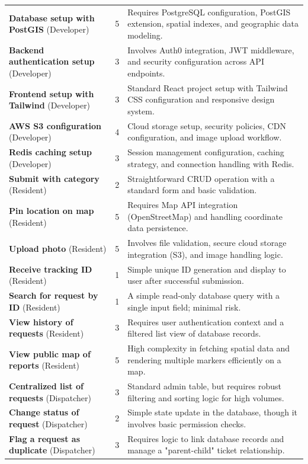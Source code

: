 \documentclass[12pt,a4paper]{article}
\begin{document}
\begin{longtable}{|p{}|c|p{}|}
\textbf{Database setup with PostGIS} (Developer) & 5 & Requires PostgreSQL configuration, PostGIS extension, spatial indexes, and geographic data modeling. \\
\textbf{Backend authentication setup} (Developer) & 3 & Involves Auth0 integration, JWT middleware, and security configuration across API endpoints. \\
\textbf{Frontend setup with Tailwind} (Developer) & 3 & Standard React project setup with Tailwind CSS configuration and responsive design system. \\
\textbf{AWS S3 configuration} (Developer) & 4 & Cloud storage setup, security policies, CDN configuration, and image upload workflow. \\
\textbf{Redis caching setup} (Developer) & 3 & Session management configuration, caching strategy, and connection handling with Redis. \\
\textbf{Submit with category} (Resident) & 2 & Straightforward CRUD operation with a standard form and basic validation. \\
\textbf{Pin location on map} (Resident) & 5 & Requires Map API integration (OpenStreetMap) and handling coordinate data persistence. \\
\textbf{Upload photo} (Resident) & 5 & Involves file validation, secure cloud storage integration (S3), and image handling logic. \\
\textbf{Receive tracking ID} (Resident) & 1 & Simple unique ID generation and display to user after successful submission. \\
\textbf{Search for request by ID} (Resident) & 1 & A simple read-only database query with a single input field; minimal risk. \\
\textbf{View history of requests} (Resident) & 3 & Requires user authentication context and a filtered list view of database records. \\
\textbf{View public map of reports} (Resident) & 5 & High complexity in fetching spatial data and rendering multiple markers efficiently on a map. \\
\textbf{Centralized list of requests} (Dispatcher) & 3 & Standard admin table, but requires robust filtering and sorting logic for high volumes. \\
\textbf{Change status of request} (Dispatcher) & 2 & Simple state update in the database, though it involves basic permission checks. \\
\textbf{Flag a request as duplicate} (Dispatcher) & 3 & Requires logic to link database records and manage a "parent-child" ticket relationship. \\

\end{longtable}
\end{document}
